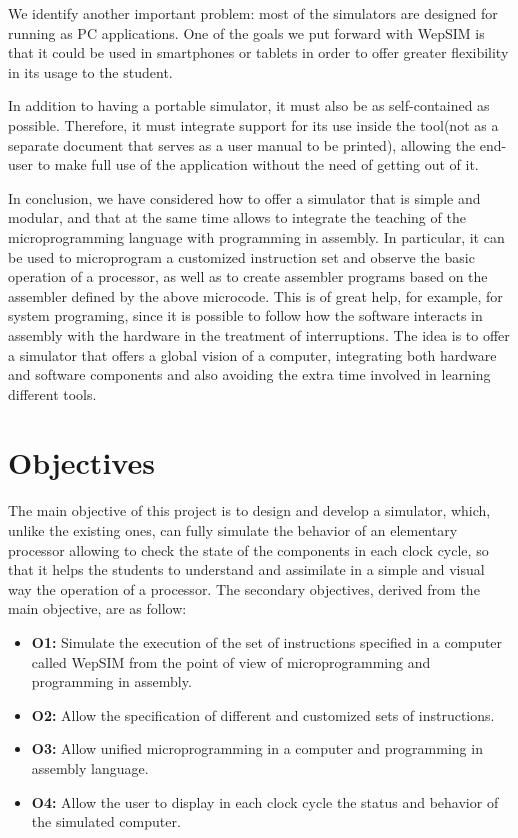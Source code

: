We identify another important problem: most of the simulators are designed for running as PC applications. One of the goals we put forward with WepSIM is that it could be used in smartphones or tablets in order to offer greater flexibility in its usage to the student.

In addition to having a portable simulator, it must also be as self-contained as possible. Therefore, it must integrate support for its use inside the tool(not as a separate document that serves as a user manual to be printed), allowing the end-user to make full use of the application without the need of getting out of it.

In conclusion, we have considered how to offer a simulator that is simple and modular, and that at the same time allows to integrate the teaching of the microprogramming language with programming in assembly. In particular, it can be used to microprogram a customized instruction set and observe the basic operation of a processor, as well as to create assembler programs based on the assembler defined by the above microcode. This is of great help, for example, for system programing, since it is possible to follow how the software interacts in assembly with the hardware in the treatment of interruptions. The idea is to offer a simulator that offers a global vision of a computer, integrating both hardware and software components and also avoiding the extra time involved in learning different tools.


\section*{Objectives}

The main objective of this project is to design and develop a simulator, which, unlike the existing ones, can fully simulate the behavior of an elementary processor allowing to check the state of the components in each clock cycle, so that it helps the students to understand and assimilate in a simple and visual way the operation of a processor. The secondary objectives, derived from the main objective, are as follow:

\begin{itemize}

\item \textbf{O1:} Simulate the execution of the set of instructions specified in a computer called WepSIM from the point of view of microprogramming and programming in assembly.

\item \textbf{O2:} Allow the specification of different and customized sets of instructions.

\item \textbf{O3:} Allow unified microprogramming in a computer and programming in assembly language.


\item \textbf{O4:} Allow the user to display in each clock cycle the status and behavior of the simulated computer.

\end{itemize}

